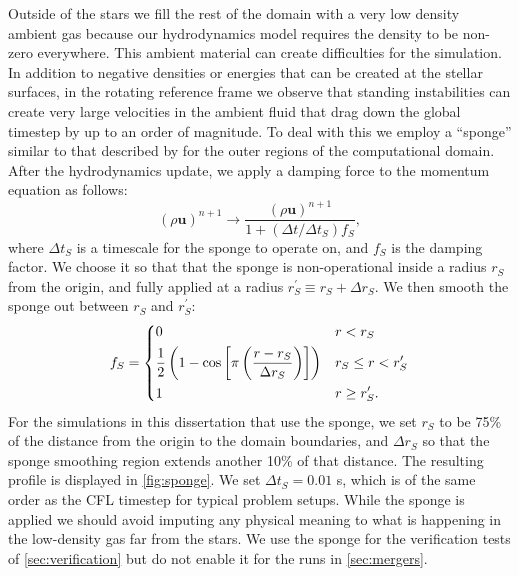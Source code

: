 \documentclass[12pt]{article}
\begin{document}
Outside of the stars we fill the rest of the domain with a very low density 
ambient gas because our hydrodynamics model requires the density to be 
non-zero everywhere. This ambient material can create difficulties for the simulation.
In addition to negative densities or energies that can be created at the stellar surfaces, 
in the rotating reference frame we observe that standing instabilities can create very 
large velocities in the ambient fluid that drag down the global timestep by 
up to an order of magnitude.  To deal with this we employ a ``sponge'' similar 
to that described by \citet{maestro3} for the outer regions of the computational domain. 
After the hydrodynamics update, we apply a damping force to the momentum
equation as follows:
\begin{equation}
  (\rho \mathbf{u})^{n+1} \to \frac{(\rho \mathbf{u})^{n+1}}{1 + (\Delta t / \Delta t_S) f_S},
\end{equation} 
where $\Delta t_S$ is a timescale for the sponge to operate on, and
$f_S$ is the damping factor.  We choose it so that that the sponge is
non-operational inside a radius $r_S$ from the origin, and fully
applied at a radius $r_S^\prime \equiv r_S + \Delta r_S$. We then
smooth the sponge out between $r_S$ and $r_S^\prime$:
\begin{equation}
  f_{S} = \begin{dcases} 0 & r < r_S \\ \frac{1}{2}\left(1 - \text{cos}\left[\pi\left(\dfrac{r - r_S}{\Delta r_S}\right)\right]\right) & r_S \leq r < r_S^\prime \\ 1 & r \geq r_S^\prime. \end{dcases}\label{eq:sponge_frac}
\end{equation}
For the simulations in this dissertation that use the sponge, we set $r_S$ to be 75\% of the 
distance from the origin to the domain boundaries, and $\Delta r_S$ so
that the sponge smoothing region extends another 10\% of that distance.
The resulting profile is displayed in \autoref{fig:sponge}. We set $\Delta
t_S = 0.01$ s, which is of the same order as the CFL timestep
for typical problem setups. While the sponge is applied we should avoid imputing any physical 
meaning to what is happening in the low-density gas far from the stars. We use the
sponge for the verification tests of \autoref{sec:verification} but do not enable it
for the runs in \autoref{sec:mergers}.
\end{document}
